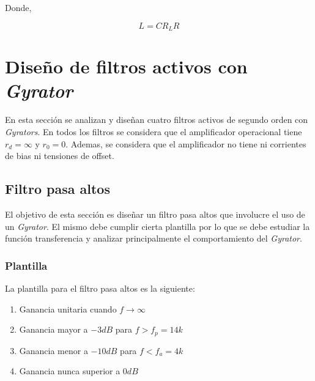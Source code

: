 Donde, 

\begin{equation} L = C R_L R \label{ej2_ecua_gyrator_3}\end{equation}




\section {Diseño de filtros activos con \textit{Gyrator}}
En esta sección se analizan y diseñan cuatro filtros activos de segundo orden con \textit{Gyrators}. En todos los filtros se considera que el amplificador operacional tiene $r_d = \infty$ y $r_0 = 0$. Ademas, se considera que el amplificador no tiene
ni corrientes de bias ni tensiones de offset.  


\subsection{Filtro pasa altos}
El objetivo de esta sección es diseñar un filtro pasa altos que involucre el uso de un \textit{Gyrator}. El mismo debe cumplir cierta plantilla por lo que se debe estudiar la función transferencia y analizar principalmente el comportamiento del \textit{Gyrator}. 


\subsubsection{Plantilla}
La plantilla para el filtro pasa altos es la siguiente:

\begin{enumerate}
	\item Ganancia unitaria cuando $f \rightarrow \infty$
	\item Ganancia mayor a $-3dB$ para $f>f_p = 14k$
	\item Ganancia menor a $-10dB$ para $f<f_a = 4k$
	\item Ganancia nunca superior a $0dB$  
\end{enumerate}

